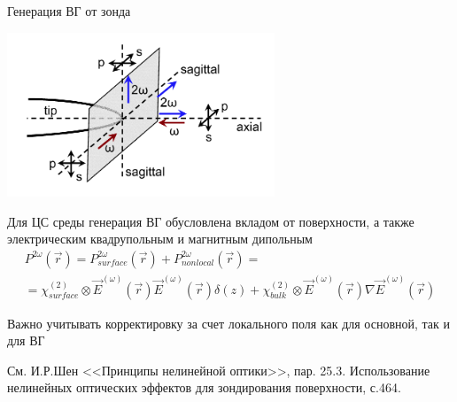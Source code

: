 \documentclass[9pt, compress, xcolor=table]{beamer}
\begin{document}
\begin{frame}{Генерация ВГ от зонда}
\begin{center}
\includegraphics[width=0.6\textwidth]{shg3}
\end{center}

Для ЦС среды генерация ВГ обусловлена вкладом от поверхности, а также электрическим квадрупольным и магнитным дипольным
\begin{multline*}
P^{2\omega}(\vec r) = P^{2\omega}_{surface}(\vec r)+P^{2\omega}_{nonlocal}(\vec r)=\\=\chi^{(2)}_{surface}\otimes \vec E ^{(\omega)}(\vec r)\vec E^{(\omega)}(\vec r)\delta(z)+\chi^{(2)}_{bulk}\otimes \vec E ^{(\omega)}(\vec r)\nabla\vec E ^{(\omega)}(\vec r)
\end{multline*}

Важно учитывать корректировку за счет локального поля как для основной, так и для ВГ

\scriptsize{См. И.Р.Шен <<Принципы нелинейной оптики>>, пар. 25.3. Использование нелинейных оптических эффектов для зондирования поверхности, с.464.}

\end{frame}
\end{document}
